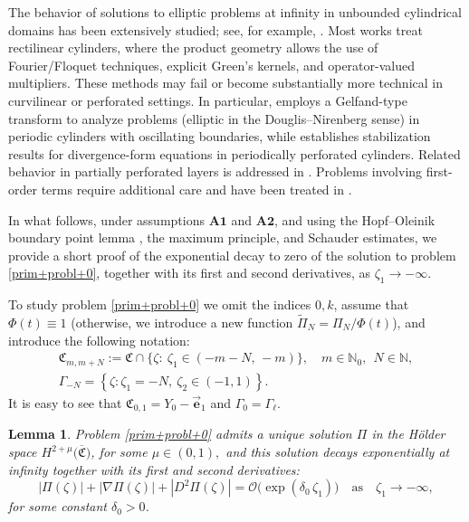 \documentclass[reqno]{amsart}            %
\newtheorem{lemma}{Lemma}[section]
\numberwithin{equation}{section}
\begin{document}
The behavior of solutions to elliptic problems at infinity in unbounded cylindrical domains has been extensively studied; see, for example, \cite{Kon-Ole_1983,Koz-Maz-Ros_97,Land-Pan-1977,Nazarov-1982,Naz99,Ole-Ios-1981,Ole_book_1996,Piat-1984}. Most works treat rectilinear cylinders, where the product geometry allows the use of Fourier/Floquet techniques, explicit Green’s kernels, and operator-valued multipliers. These methods may fail or become substantially more technical in curvilinear or perforated settings. In particular, \cite{Nazarov-1982} employs a Gelfand-type transform to analyze problems (elliptic in the Douglis–Nirenberg sense) in periodic cylinders with oscillating boundaries, while \cite{Ole-Ios-1981} establishes stabilization results for divergence-form equations in periodically perforated cylinders. Related behavior in partially perforated layers is addressed in \cite{Melnyk-2026}. Problems involving first-order terms require additional care and have been treated in \cite{Nazarov-1982,Naz99,Ole_book_1996,Piat-1984,Piat-2009,Mel-Kle-2022,Mel-Roh_Non-Diff-2024}.

In what follows, under assumptions \(\mathbf{A1}\) and \(\mathbf{A2}\), and using the Hopf–Oleinik boundary point lemma \cite{Hopf-1952,Oleinik-1952},  the maximum principle, and Schauder estimates, 
we provide a short proof of the exponential decay to zero of the solution to problem \eqref{prim+probl+0}, together with its first and second derivatives, as \(\zeta_1 \to -\infty\).
	
	
	
	To study problem \eqref{prim+probl+0} we omit the indices $0, k$, assume that $\Phi(t) \equiv 1$ (otherwise, we introduce a new function $\widetilde{\Pi}_{N} = \Pi_{N}/\Phi(t)$), and introduce the following notation:
	\begin{gather*}
		\mathfrak{C}_{m,m + N} := \mathfrak{C} \cap \{\zeta\colon \ \zeta_1\in (-m-N, \, -m)\}, \quad m \in \mathbb{N}_0, \ \ N \in \mathbb{N},	
		\\
		\Gamma_{-N} = \left\{\zeta \colon \zeta_1 = -N, \ \zeta_2 \in (-1,1)\right\}.
	\end{gather*}
	It is easy to see that $\mathfrak{C}_{0,1} = Y_0 - \vec{\boldsymbol{e}}_1$ and  $\Gamma_0 = \Gamma_\ell.$ 
	
	\begin{lemma}\label{lemma-4-5}
		Problem \eqref{prim+probl+0} admits a unique solution \(\Pi\) in the H\"older space
		\(H^{2+\mu}\big(\overline{\mathfrak{C}}\big)\), for some \(\mu \in (0,1),\) and this solution
		decays exponentially at infinity together with its first and second derivatives:
		\begin{equation}\label{bv-1}
			|\Pi(\zeta)| + |\nabla\Pi(\zeta)| + |D^2\Pi(\zeta)| = \mathcal{O}\big(\exp(\delta_0 \, \zeta_1)\big)
			\quad \text{as} \quad \zeta_1 \to -\infty,
		\end{equation}
		for some constant \(\delta_0 > 0\).
	\end{lemma}
	
\end{document}

